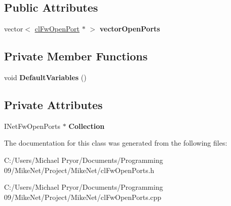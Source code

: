 \subsection*{Public Attributes}
\begin{DoxyCompactItemize}
\item 
\hypertarget{classcl_fw_open_ports_a90bd991eb367a245d9198f79735c1b94}{
vector$<$ \hyperlink{classcl_fw_open_port}{clFwOpenPort} $\ast$ $>$ {\bfseries vectorOpenPorts}}
\label{classcl_fw_open_ports_a90bd991eb367a245d9198f79735c1b94}

\end{DoxyCompactItemize}
\subsection*{Private Member Functions}
\begin{DoxyCompactItemize}
\item 
\hypertarget{classcl_fw_open_ports_a2b6932db710784a0cc3bf0bae03ddb93}{
void {\bfseries DefaultVariables} ()}
\label{classcl_fw_open_ports_a2b6932db710784a0cc3bf0bae03ddb93}

\end{DoxyCompactItemize}
\subsection*{Private Attributes}
\begin{DoxyCompactItemize}
\item 
\hypertarget{classcl_fw_open_ports_a6723d054d789c7aef739ce12d6a71a01}{
INetFwOpenPorts $\ast$ {\bfseries Collection}}
\label{classcl_fw_open_ports_a6723d054d789c7aef739ce12d6a71a01}

\end{DoxyCompactItemize}


The documentation for this class was generated from the following files:\begin{DoxyCompactItemize}
\item 
C:/Users/Michael Pryor/Documents/Programming 09/MikeNet/Project/MikeNet/clFwOpenPorts.h\item 
C:/Users/Michael Pryor/Documents/Programming 09/MikeNet/Project/MikeNet/clFwOpenPorts.cpp\end{DoxyCompactItemize}
